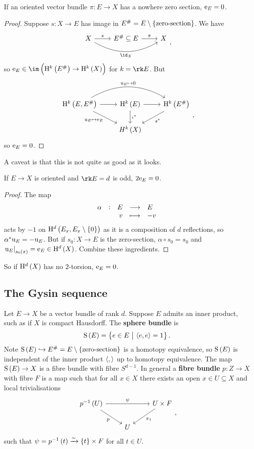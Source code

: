 \begin{lemma}
If an oriented vector bundle $ \pi : E \to X $ has a nowhere zero section, $ \mathrm{e}_E = 0 $.
\end{lemma}

\begin{proof}
Suppose $ s : X \to E $ has image in $ E^\# = E \setminus \cbr{\text{zero-section}} $. We have
$$
\begin{tikzcd}
X \arrow{r}{s} \arrow[bend right=30]{rr}[swap]{\id_X} & E^\# \subseteq E \arrow{r}{\pi} & X \\
\end{tikzcd},
$$
so $ \e_E \in \im \br{\H^k\br{E^\#} \to \H^k\br{X}} $ for $ k = \rk E $. But
$$
\begin{tikzcd}
\H^k\br{E, E^\#} \arrow{r} \arrow[bend left=30]{rr}{\u_E \mapsto 0} \arrow{dr}[swap]{\u_E \mapsto \e_E} & \H^k\br{E} \arrow{r} \arrow{d}{\iota^*} & \H^k\br{E^\#} \arrow{dl}{s^*} \\
& H^k\br{X} &
\end{tikzcd},
$$
so $ \mathrm{e}_E = 0 $.
\end{proof}

A caveat is that this is not quite as good as it looks.

\begin{lemma}
If $ E \to X $ is oriented and $ \rk E = d $ is odd, $ 2\mathrm{e}_E = 0 $.
\end{lemma}

\begin{proof}
The map
$$ \function[\alpha]{E}{E}{v}{-v} $$
acts by $ -1 $ on $ \H^d\br{E_x, E_x \setminus \cbr{0}} $ as it is a composition of $ d $ reflections, so $ \alpha^*\mathrm{u}_E = -\mathrm{u}_E $. But if $ s_0 : X \to E $ is the zero-section, $ \alpha \circ s_0 = s_0 $ and $ \eval{\u_E}_{s_0\br{x}} = \e_E \in \H^d\br{X} $. Combine these ingredients.
\end{proof}

So if $ \H^d\br{X} $ has no $ 2 $-torsion, $ \mathrm{e}_E = 0 $.

\subsection{The Gysin sequence}

Let $ E \to X $ be a vector bundle of rank $ d $. Suppose $ E $ admits an inner product, such as if $ X $ is compact Hausdorff. The \textbf{sphere bundle} is
$$ \S\br{E} = \cbr{e \in E \st \abr{e, e} = 1}. $$
Note $ \S\br{E} \hookrightarrow E^\# = E \setminus \cbr{\text{zero-section}} $ is a homotopy equivalence, so $ \S\br{E} $ is independent of the inner product $ \left\langle , \right\rangle $ up to homotopy equivalence. The map $ \S\br{E} \to X $ is a fibre bundle with fibre $ S^{d - 1} $. In general a \textbf{fibre bundle} $ p : Z \to X $ with fibre $ F $ is a map such that for all $ x \in X $ there exists an open $ x \in U \subseteq X $ and local trivialisations
$$
\begin{tikzcd}
p^{-1}\br{U} \arrow{rr}{\psi} \arrow{dr}[swap]{p} & & U \times F \arrow{dl}{\pi_1} \\
& U &
\end{tikzcd},
$$
such that $ \psi = p^{-1}\br{t} \xrightarrow{\sim} \cbr{t} \times F $ for all $ t \in U $.

